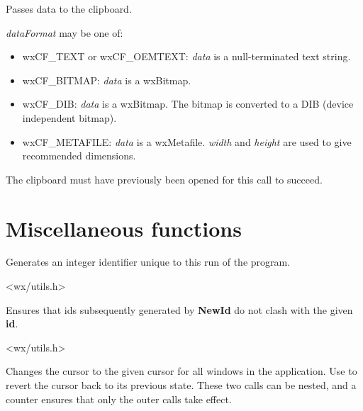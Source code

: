 

Passes data to the clipboard.

{\it dataFormat} may be one of:

\begin{itemize}\itemsep=0pt
\item wxCF\_TEXT or wxCF\_OEMTEXT: {\it data} is a null-terminated text string.
\item wxCF\_BITMAP: {\it data} is a wxBitmap.
\item wxCF\_DIB: {\it data} is a wxBitmap. The bitmap is converted to a DIB (device independent bitmap).
\item wxCF\_METAFILE: {\it data} is a wxMetafile. {\it width} and {\it height} are used to give recommended dimensions.
\end{itemize}

The clipboard must have previously been opened for this call to succeed.

\section{Miscellaneous functions}\label{miscellany}



Generates an integer identifier unique to this run of the program.


<wx/utils.h>



Ensures that ids subsequently generated by {\bf NewId} do not clash with
the given {\bf id}.


<wx/utils.h>

\label{wxbeginbusycursor}


Changes the cursor to the given cursor for all windows in the application.
Use  to revert the cursor back
to its previous state. These two calls can be nested, and a counter
ensures that only the outer calls take effect.

